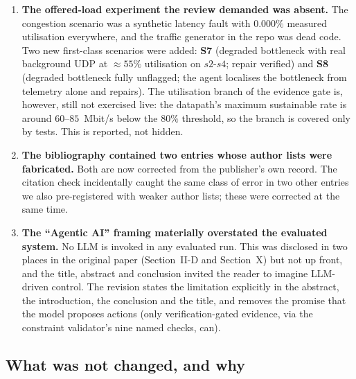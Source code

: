 \documentclass[11pt,a4paper]{article}
\begin{document}
\begin{enumerate}[leftmargin=1.5em]
  \texttt{no\_better\_path} with nothing installed.
\item \textbf{The offered-load experiment the review demanded was absent.}
  The congestion scenario was a synthetic latency fault with $0.000\%$ measured
  utilisation everywhere, and the traffic generator in the repo was dead code.
  Two new first-class scenarios were added: \textbf{S7} (degraded bottleneck with
  real background UDP at $\approx 55\%$ utilisation on $s2$-$s4$; repair verified)
  and \textbf{S8} (degraded bottleneck fully unflagged; the agent localises the
  bottleneck from telemetry alone and repairs). The utilisation branch of the
  evidence gate is, however, still not exercised live: the datapath's maximum
  sustainable rate is around $60$--$85$~Mbit/s below the $80\%$ threshold, so the
  branch is covered only by tests. This is reported, not hidden.
\item \textbf{The bibliography contained two entries whose author lists were
  fabricated.} Both are now corrected from the publisher's own record. The
  citation check incidentally caught the same class of error in two other
  entries we also pre-registered with weaker author lists; these were corrected
  at the same time.
\item \textbf{The ``Agentic AI'' framing materially overstated the evaluated
  system.} No LLM is invoked in any evaluated run. This was disclosed in two
  places in the original paper (Section~II-D and Section~X) but not up front,
  and the title, abstract and conclusion invited the reader to imagine LLM-driven
  control. The revision states the limitation explicitly in the abstract, the
  introduction, the conclusion and the title, and removes the promise that the
  model proposes actions (only verification-gated evidence, via the constraint
  validator's nine named checks, can).
\end{enumerate}

\subsection{What was not changed, and why}
\end{document}
